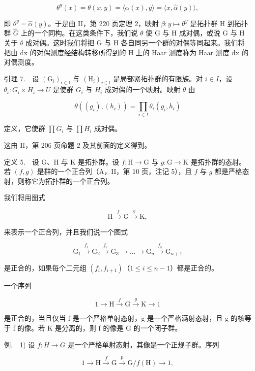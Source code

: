 \[
\theta^ {y} (x) = \theta (x, y) = \langle \alpha (x), y \rangle = \langle x, \widehat {\alpha} (y) \rangle ,
\]

即 \(\theta^{y} = \widehat{\alpha}(y)\)。于是由 II，第 220 页定理 2，映射 \(\beta: y \mapsto \theta^{y}\) 是拓扑群 H 到拓扑群 \(\widehat{G}\) 上的一个同构。在这类条件下，我们说 \(\theta\) 使 G 与 H 成对偶，或说 G 与 H 关于 \(\theta\) 成对偶。这时我们将把 G 与 H 各自同另一个群的对偶等同起来。我们将把由 dx 的对偶测度经结构转移所得到的 H 上的 Haar 测度称为 Haar 测度 dx 的对偶测度。

引理 7.　设 \((\mathrm{G}_{i})_{i\in\mathrm{I}}\) 与 \((\mathrm{H}_{i})_{i\in\mathrm{I}}\) 是局部紧拓扑群的有限族。对 \(i\in I\)，设 \(\theta_{i}\colon G_{i}\times H_{i}\to U\) 是使群 \(G_{i}\) 与 \(H_{i}\) 成对偶的一个映射。映射 \(\theta\) 由

\[
\theta ((g _ {i}), (h _ {i})) = \prod_ {i \in I} \theta_ {i} (g _ {i}, h _ {i})
\]

定义，它使群 \(\prod G_{i}\) 与 \(\prod H_{i}\) 成对偶。

这由 II，第 206 页命题 2 及其前面的定义得到。

定义 5.　设 G、H 与 K 是拓扑群。设 \(f: \mathrm{H} \to \mathrm{G}\) 与 \(g: \mathrm{G} \to \mathrm{K}\) 是拓扑群的态射。若 \((f, g)\) 是群的一个正合列（A，II，第 10 页，注记 5），且 \(f\) 与 \(g\) 都是严格态射，则称它为拓扑群的一个正合列。

我们将用图式

\[
\mathrm{H} \xrightarrow {f} \mathrm{G} \xrightarrow {g} \mathrm{K},
\]

来表示一个正合列，并且我们说一个图式

\[
\mathrm{G} _ {1} \xrightarrow {f _ {1}} \mathrm{G} _ {2} \xrightarrow {f _ {2}} \mathrm{G} _ {3} \rightarrow \dots \rightarrow \mathrm{G} _ {n} \xrightarrow {f _ {n}} \mathrm{G} _ {n + 1}
\]

是正合的，如果每个二元组 \((f_i, f_{i+1})\)（\(1 \leqslant i \leqslant n-1\)）都是正合的。

一个序列

\[
1 \to \mathrm{H} \xrightarrow {f} \mathrm{G} \xrightarrow {g} \mathrm{K} \to 1
\]

是正合的，当且仅当 f 是一个严格单射态射，g 是一个严格满射态射，且 g 的核等于 f 的像。若 K 是分离的，则 f 的像是 G 的一个闭子群。

例.　1) 设 \(f\colon H \to G\) 是一个严格单射态射，其像是一个正规子群。序列

\[
1 \to \mathrm{H} \xrightarrow {f} \mathrm{G} \xrightarrow {p} \mathrm{G} / f (\mathrm{H}) \to 1,
\]

